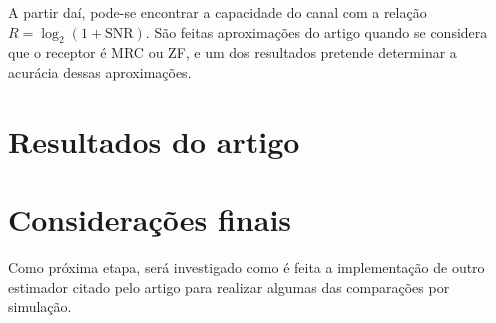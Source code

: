 \documentclass{article}
\begin{document}
	A partir daí, pode-se encontrar a capacidade do canal com a relação $R=\log_2(1+\text{SNR})$. São feitas aproximações do artigo quando se considera que o receptor é MRC ou ZF, e um dos resultados pretende determinar a acurácia dessas aproximações. 

	\section{Resultados do artigo}
	\label{sec:resultados_do_artigo}

	

	\section{Considerações finais}
	\label{sec:conclusao}

	Como próxima etapa, será investigado como é feita a implementação de outro estimador citado pelo artigo para realizar algumas das comparações por simulação. 

	
	
\end{document}
